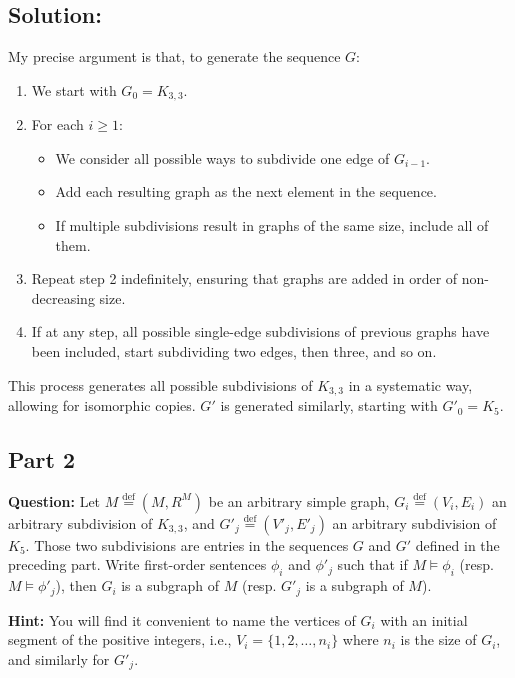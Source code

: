\documentclass{article}
\begin{document}
\subsection*{Solution:}
My precise argument is that, to generate the sequence $G$:

\begin{enumerate}
    \item We start with $G_0 = K_{3,3}$.
    \item For each $i \geq 1$:
        \begin{itemize}
            \item We consider all possible ways to subdivide one edge of $G_{i-1}$.
            \item Add each resulting graph as the next element in the sequence.
            \item If multiple subdivisions result in graphs of the same size, include all of them.
        \end{itemize}
    \item Repeat step 2 indefinitely, ensuring that graphs are added in order of non-decreasing size.
    \item If at any step, all possible single-edge subdivisions of previous graphs have been included, start subdividing two edges, then three, and so on.
\end{enumerate}
This process generates all possible subdivisions of $K_{3,3}$ in a systematic way, allowing for isomorphic copies. $G'$ is generated similarly, starting with $G'_0 = K_5$.


\newpage

\subsection*{Part 2}


\vspace{1em}
\begin{mdframed}
    \textbf{Question:} Let $M \stackrel{\text{def}}{=} (M, R^M)$ be an arbitrary simple graph, $G_i \stackrel{\text{def}}{=} (V_i, E_i)$ an arbitrary subdivision of $K_{3,3}$, and $G'_j \stackrel{\text{def}}{=} (V'_j, E'_j)$ an arbitrary subdivision of $K_5$. Those two subdivisions are entries in the sequences $G$ and $G'$ defined in the preceding part. Write first-order sentences $\phi_i$ and $\phi'_j$ such that if $M \models \phi_i$ (resp. $M \models \phi'_j$), then $G_i$ is a subgraph of $M$ (resp. $G'_j$ is a subgraph of $M$).

    \vspace{1em}
    \textbf{Hint:} You will find it convenient to name the vertices of $G_i$ with an initial segment of the positive integers, i.e., $V_i = \{1, 2, \ldots, n_i\}$ where $n_i$ is the size of $G_i$, and similarly for $G'_j$.
    
\end{mdframed}
\end{document}
